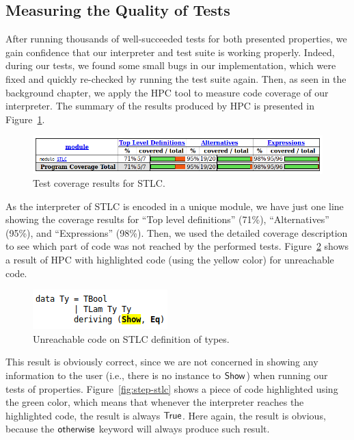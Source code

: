 \documentclass[tese,capa,english]{texufpel}
\newcommand{\Con}[1]{\green{\mathsf{#1}}}
\newcommand{\V}[1]{\black{\mathsf{#1}}}
\newcommand{\HK}[1]{\purple{\mathsf{#1}}}
\begin{document}
\subsection{Measuring the Quality of Tests}

After running thousands of well-succeeded tests for both presented properties, we gain confidence that our interpreter and test suite is working properly. Indeed, during our tests, we found some small bugs in our implementation, which were fixed and quickly re-checked by running the test suite again. Then, as seen in the background chapter, we apply the HPC tool to measure code coverage of our interpreter. The summary of the results produced by HPC is presented in Figure~\ref{fig:coverage-stlc}.

\begin{figure}[!htb]
\centering
\includegraphics[width=0.85\linewidth]{Images/coverage_stlc}
\caption{Test coverage results for STLC.}
\vspace{-1ex}
\label{fig:coverage-stlc}
\end{figure}

As the interpreter of STLC is encoded in a unique module, we have just one line showing the coverage results for ``Top level definitions'' (71\%), ``Alternatives'' (95\%), and ``Expressions'' (98\%). Then, we used the detailed coverage description to see which part of code was not reached by the performed tests. Figure~\ref{fig:ty-stlc} shows a result of HPC with highlighted code (using the yellow color) for unreachable code.

\begin{figure}[!htb]
\centering
\includegraphics[width=0.3\linewidth]{Images/ty_stlc}
\caption{Unreachable code on STLC definition of types.}
\vspace{-1ex}
\label{fig:ty-stlc}
\end{figure}

This result is obviously correct, since we are not concerned in showing any information to the user (i.e., there is no instance to \ensuremath{\V{Show}})  when running our tests of properties. Figure~\ref{fig:step-stlc} shows a piece of code highlighted using the green color, which means that whenever the interpreter reaches the highlighted code, the result is always \ensuremath{\Con{True}}. Here again, the result is obvious, because the \ensuremath{\HK{otherwise}} keyword will always produce such result. 
\end{document}
